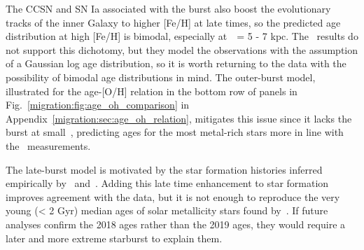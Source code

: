 The CCSN and SN Ia associated with the burst also boost the evolutionary 
tracks of the inner Galaxy to higher [Fe/H] at late times, so the predicted 
age distribution at high [Fe/H] is bimodal, especially at~\rgal~= 5 - 7 kpc. 
The~\citet{Feuillet2019} results do not support this dichotomy, but they 
model the observations with the assumption of a Gaussian log age distribution, 
so it is worth returning to the data with the possibility of bimodal age 
distributions in mind. 
The outer-burst model, illustrated for the age-[O/H] relation in the bottom 
row of panels in Fig.~\ref{migration:fig:age_oh_comparison} in 
Appendix~\ref{migration:sec:age_oh_relation}, mitigates this issue since it lacks the 
burst at small~\rgal, predicting ages for the most metal-rich stars more in line 
with the~\citet{Feuillet2019} measurements. 
\par 
The late-burst model is motivated by the star formation histories inferred 
empirically by~\citet{Isern2019} and~\citet{Mor2019}. 
Adding this late time enhancement to star formation improves agreement with the 
\citet{Feuillet2019} data, but it is not enough to reproduce the very young 
(< 2 Gyr) median ages of solar metallicity stars found by~\citet{Feuillet2018}. 
If future analyses confirm the 2018 ages rather than the 2019 ages, they would 
require a later and more extreme starburst to explain them. 
